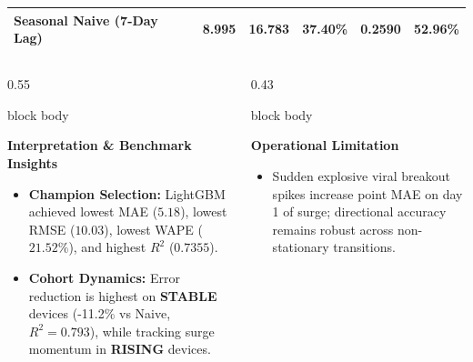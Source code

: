 \documentclass[aspectratio=169, 10pt]{beamer}
\newenvironment{card}[1][]{%
        \begin{beamercolorbox}[rounded=true,shadow=false,wd=\linewidth,sep=3.5pt,#1]{block body}%
        \fontsize{7.8pt}{9.8pt}\selectfont%
    }{%
        \end{beamercolorbox}%
    }
\begin{document}
\begin{frame}[t]
\begin{table}[h]
{\begin{tabular}{lccccc}
                \textbf{Seasonal Naive (7-Day Lag)} & 8.995 & 16.783 & 37.40\% & 0.2590 & 52.96\% \\
                \bottomrule
            \end{tabular}}
        \end{table}
        \vspace{-0.2cm}
        \begin{columns}[T]
            \begin{column}{0.55\textwidth}
                \begin{card}
                    {\fontsize{7.2pt}{8.5pt}\selectfont \textbf{\color{NavyPrimary}Interpretation \& Benchmark Insights}}\\[0.03cm]
                    \begin{itemize}\setlength{\itemsep}{1pt}
                        \item \textbf{Champion Selection:} LightGBM achieved lowest MAE ($5.18$), lowest RMSE ($10.03$), lowest WAPE ($21.52\%$), and highest $R^2$ ($0.7355$).
                        \item \textbf{Cohort Dynamics:} Error reduction is highest on \textbf{STABLE} devices (-11.2\% vs Naive, $R^2=0.793$), while tracking surge momentum in \textbf{RISING} devices.
                    \end{itemize}
                \end{card}
            \end{column}

            \begin{column}{0.43\textwidth}
                \begin{card}
                    {\fontsize{7.2pt}{8.5pt}\selectfont \textbf{\color{CoralAccent}Operational Limitation}}\\[0.03cm]
                    \begin{itemize}\setlength{\itemsep}{1pt}
                        \item Sudden explosive viral breakout spikes increase point MAE on day 1 of surge; directional accuracy remains robust across non-stationary transitions.
                    \end{itemize}
                \end{card}
            \end{column}
        \end{columns}
    \end{frame}                                                                                                                                                                                       
                                                                                                                                                                                                       
\end{document}
